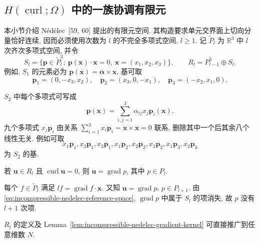 \subsection{$H(\operatorname{curl};\Omega)$ 中的一族协调有限元}
\label{subsec:incompressible-nedelec-elements}

本小节介绍 Nédélec~[59, 60] 提出的有限元空间.
其构造要求单元交界面上切向分量恰好连续,
因而必须使用次数为 $l$ 的不完全多项式空间, $l\geq1$.
记 $\widetilde P_l$ 为 $\mathbb R^3$ 中 $l$ 次齐次多项式空间, 并令
\begin{equation}\label{eq:incompressible-nedelec-reference-space}
S_l=\{\mathbf p\in\widetilde P_l^3;
\ \mathbf p(\mathbf x)\cdot\mathbf x=0,
\ \mathbf x=(x_1,x_2,x_3)\},
\qquad
R_l=P_{l-1}^3\oplus S_l.
\end{equation}
例如, $S_1$ 的元素必为
$\mathbf p(\mathbf x)=\boldsymbol\alpha\times\mathbf x$, 基可取
\[
\mathbf p_1=(0,-x_3,x_2),
\quad\mathbf p_2=(x_3,0,-x_1),
\quad\mathbf p_3=(-x_2,x_1,0).
\]

$S_2$ 中每个多项式可写成
\[
\mathbf p(\mathbf x)=\sum_{i,j=1}^3
\alpha_{ij}x_j\mathbf p_i(\mathbf x).
\]
九个多项式 $x_j\mathbf p_i$ 由关系
$\sum_{i=1}^3x_i\mathbf p_i=\mathbf x\times\mathbf x=0$ 联系,
删除其中一个后其余八个线性无关. 例如可取
\[
x_1\mathbf p_1,x_2\mathbf p_1,x_3\mathbf p_1,
x_1\mathbf p_2,x_2\mathbf p_2,x_3\mathbf p_2,
x_1\mathbf p_3,x_2\mathbf p_3
\]
为 $S_2$ 的基.

\begin{Lemma}\label{lem:incompressible-nedelec-gradient-kernel}
若 $\mathbf u\in R_l$ 且
$\operatorname{curl}\mathbf u=0$, 则
$\mathbf u=\operatorname{grad}p$, 其中 $p\in P_l$.
\end{Lemma}

\begin{Proof}
每个 $f\in\widetilde P_l$ 满足
$lf=\operatorname{grad}f\cdot\mathbf x$.
又知 $\mathbf u=\operatorname{grad}p$, $p\in P_{l+1}$.
由 \eqref{eq:incompressible-nedelec-reference-space},
$\operatorname{grad}p$ 中属于 $S_l$ 的项消失,
故 $p$ 没有 $l+1$ 次项.
\end{Proof}

\begin{Remark}\label{rem:incompressible-nedelec-arbitrary-dimension}
$R_l$ 的定义及 Lemma~\ref{lem:incompressible-nedelec-gradient-kernel}
可直接推广到任意维数 $N$.
\end{Remark}


